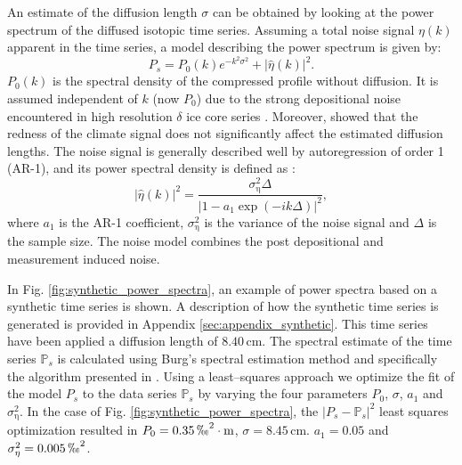 \documentclass[11pt, draftcls, onecolumn]{IEEEtran} %
\numberwithin{equation}{section}
\numberwithin{table}{section}
\numberwithin{figure}{section}
\begin{document}
An estimate of the diffusion length $\sigma$ can be obtained by looking at the power spectrum of the diffused 
isotopic time series. Assuming a total noise signal $\eta \left( k \right)$
apparent in the time series, a model describing the power spectrum is given by: 
\begin{equation}
P_s =    P_0(k) {e}^{-k^2 \sigma^2} + {\vert \hat{\eta} \left( k \right) \vert} ^{2}. 
\label{eq:powerspectrum}
\end{equation}
$P_0(k)$ is the spectral density of the compressed profile without diffusion. 
It is assumed independent of $k$ (now $P_0$) due to the strong depositional noise 
encountered in high resolution $\delta$ ice core series \citep{Johnsen2000}. 
Moreover, \cite{Gkinis2014} showed that the redness of the climate signal does not significantly affect the 
estimated diffusion lengths.
The noise signal is generally described well by autoregression of order 1 (AR-1),
and its power spectral density is defined as \citep{Kay1981}:
\begin{equation}
|\hat{\eta}(k )|^2 = \frac{\sigma_{\mathrm{\eta}}^2 \Delta}
 {\left| 1-a_1 \exp{\left( -i k  \Delta \right) } \right|^2} {},
\end{equation}
where $a_1$ is the AR-1 coefficient, $\sigma_{\mathrm{\eta}}^2$ is the variance of the noise signal 
and $\Delta$ is the sample size.
The noise model combines the post depositional and measurement induced noise.

In Fig. \ref{fig:synthetic_power_spectra}, an example of power spectra based on a synthetic time series is shown. 
A description of how the synthetic time series is generated is provided in Appendix \ref{sec:appendix_synthetic}.
This time series have been applied a diffusion length of  $8.40 \, \mathrm{cm}$.
The spectral estimate of the time series $\mathbb{P}_s$ 
is calculated using Burg's spectral estimation method
\citep{Kay1981} and specifically the algorithm presented in \cite{Andersen1974}. 
Using a least--squares approach we optimize the fit of the model $P_s$ to the data series $\mathbb{P}_s$ by varying the four 
parameters $P_0$, $\sigma$, $a_1$ and $\sigma_{\mathrm{\eta}}^2$.
In the case of Fig. \ref{fig:synthetic_power_spectra},
the $\vert P_s - \mathbb{P}_s \vert^2$ least squares optimization resulted in 
$P_0=0.35\,\permil^2\cdot \mathrm{m}$, $\sigma = 8.45 \, \mathrm{cm}$. $a_1 = 0.05$ and $\sigma_{\mathrm{\eta}}^2 =0.005 \, \permil^2$.
\end{document}
